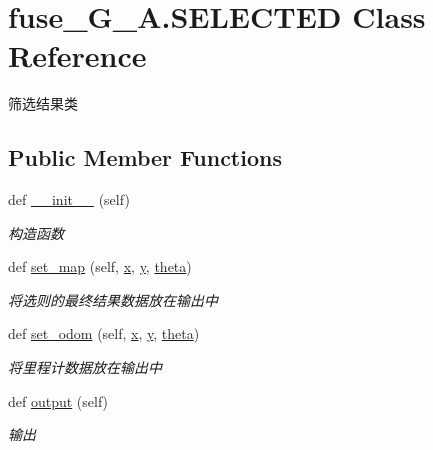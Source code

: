 \hypertarget{classfuse___g___a_1_1_s_e_l_e_c_t_e_d}{}\section{fuse\+\_\+\+G\+\_\+\+A.\+S\+E\+L\+E\+C\+T\+ED Class Reference}
\label{classfuse___g___a_1_1_s_e_l_e_c_t_e_d}


筛选结果类  


\subsection*{Public Member Functions}
\begin{DoxyCompactItemize}
\item 
def \hyperlink{classfuse___g___a_1_1_s_e_l_e_c_t_e_d_a7438d6257d35c5cf7892004b9b97ec18}{\+\_\+\+\_\+init\+\_\+\+\_\+} (self)
\begin{DoxyCompactList}\small\item\em 构造函数 \end{DoxyCompactList}\item 
def \hyperlink{classfuse___g___a_1_1_s_e_l_e_c_t_e_d_a9044b570a95d0c4cb2e8676fec844384}{set\+\_\+map} (self, \hyperlink{classfuse___g___a_1_1_s_e_l_e_c_t_e_d_ab7e4372227ead27a500b051bd2516243}{x}, \hyperlink{classfuse___g___a_1_1_s_e_l_e_c_t_e_d_a9b7c72f2da415c2ab54925216f351138}{y}, \hyperlink{classfuse___g___a_1_1_s_e_l_e_c_t_e_d_a2a2782d16fbc265cd0406c09cfa39266}{theta})
\begin{DoxyCompactList}\small\item\em 将选则的最终结果数据放在输出中 \end{DoxyCompactList}\item 
def \hyperlink{classfuse___g___a_1_1_s_e_l_e_c_t_e_d_ab14aa1e90e3aa0922cd8ca65ebec52ce}{set\+\_\+odom} (self, \hyperlink{classfuse___g___a_1_1_s_e_l_e_c_t_e_d_ab7e4372227ead27a500b051bd2516243}{x}, \hyperlink{classfuse___g___a_1_1_s_e_l_e_c_t_e_d_a9b7c72f2da415c2ab54925216f351138}{y}, \hyperlink{classfuse___g___a_1_1_s_e_l_e_c_t_e_d_a2a2782d16fbc265cd0406c09cfa39266}{theta})
\begin{DoxyCompactList}\small\item\em 将里程计数据放在输出中 \end{DoxyCompactList}\item 
def \hyperlink{classfuse___g___a_1_1_s_e_l_e_c_t_e_d_adc7cd50d5e48a1eb6a2c2008ae1cf461}{output} (self)
\begin{DoxyCompactList}\small\item\em 输出 \end{DoxyCompactList}\end{DoxyCompactItemize}
